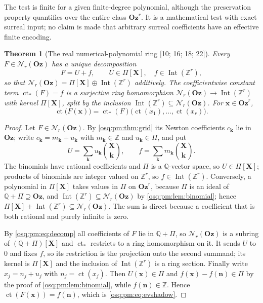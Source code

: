 \documentclass[11pt,letterpaper]{article}
\numberwithin{equation}{section}
\newtheorem{theorem}{Theorem}[section]
\theoremstyle{definition}
\theoremstyle{remark}
\theoremstyle{plain}
\newcommand{\Oz}{\mathbf{Oz}}
\newcommand{\Z}{\mathbb Z}
\newcommand{\Q}{\mathbb Q}
\newcommand{\ct}{\operatorname{ct}}
\newcommand{\Int}{\operatorname{Int}}
\newcommand{\Num}{\mathscr N}
\newcommand{\src}[1]{\textup{\textsf{[#1]}}}
\begin{document}
The test is finite for a given finite-degree polynomial, although the preservation
property quantifies over the entire class $\Oz^r$. It is a mathematical test with exact
surreal input; no claim is made that arbitrary surreal coefficients have an effective
finite encoding.

\begin{theorem}[The real numerical-polynomial ring \src{10; 16; 18; 22}]\label{osq:pm:thm:numreal}
Every $F\in\Num_r(\Oz)$ has a unique decomposition
\begin{equation}\label{osq:pm:eq:decomp}
 F=U+f,\qquad U\in\Pi[\mathbf X],\quad f\in\Int(\Z^r),
\end{equation}
so that $\Num_r(\Oz)=\Pi[\mathbf X]\oplus\Int(\Z^r)$ additively. The coefficientwise
constant term $\ct_*(F)=f$ is a surjective ring homomorphism
$\Num_r(\Oz)\to\Int(\Z^r)$ with kernel $\Pi[\mathbf X]$, split by the inclusion
$\Int(\Z^r)\subseteq\Num_r(\Oz)$. For $\mathbf x\in\Oz^r$,
\begin{equation}\label{osq:pm:eq:evshadow}
 \ct\bigl(F(\mathbf x)\bigr)=\ct_*(F)\bigl(\ct(x_1),\dots,\ct(x_r)\bigr).
\end{equation}
\end{theorem}
\begin{proof}
Let $F\in\Num_r(\Oz)$. By \cref{osq:pm:thm:grid} its Newton coefficients $c_{\mathbf k}$
lie in $\Oz$; write $c_{\mathbf k}=m_{\mathbf k}+u_{\mathbf k}$ with $m_{\mathbf k}\in\Z$
and $u_{\mathbf k}\in\Pi$, and put
\[
 U=\sum_{\mathbf k}u_{\mathbf k}\binom{\mathbf X}{\mathbf k},\qquad
 f=\sum_{\mathbf k}m_{\mathbf k}\binom{\mathbf X}{\mathbf k}.
\]
The binomials have rational coefficients and $\Pi$ is a $\Q$-vector space, so
$U\in\Pi[\mathbf X]$; products of binomials are integer valued on $\Z^r$, so
$f\in\Int(\Z^r)$. Conversely, a polynomial in $\Pi[\mathbf X]$ takes values in $\Pi$ on
$\Oz^r$, because $\Pi$ is an ideal of $\Q+\Pi\supseteq\Oz$, and $\Int(\Z^r)\subseteq
\Num_r(\Oz)$ by \cref{osq:pm:lem:binomial}; hence $\Pi[\mathbf X]+\Int(\Z^r)
\subseteq\Num_r(\Oz)$. The sum is direct because a coefficient that is both rational and
purely infinite is zero.

By \eqref{osq:pm:eq:decomp} all coefficients of $F$ lie in $\Q+\Pi$, so $\Num_r(\Oz)$ is a
subring of $(\Q+\Pi)[\mathbf X]$ and $\ct_*$ restricts to a ring homomorphism on it. It
sends $U$ to $0$ and fixes $f$, so its restriction is the projection onto the second
summand; its kernel is $\Pi[\mathbf X]$ and the inclusion of $\Int(\Z^r)$ is a ring
section. Finally write $x_j=n_j+u_j$ with $n_j=\ct(x_j)$. Then $U(\mathbf x)\in\Pi$ and
$f(\mathbf x)-f(\mathbf n)\in\Pi$ by the proof of \cref{osq:pm:lem:binomial}, while
$f(\mathbf n)\in\Z$. Hence $\ct(F(\mathbf x))=f(\mathbf n)$, which is
\eqref{osq:pm:eq:evshadow}.
\end{proof}
\end{document}
